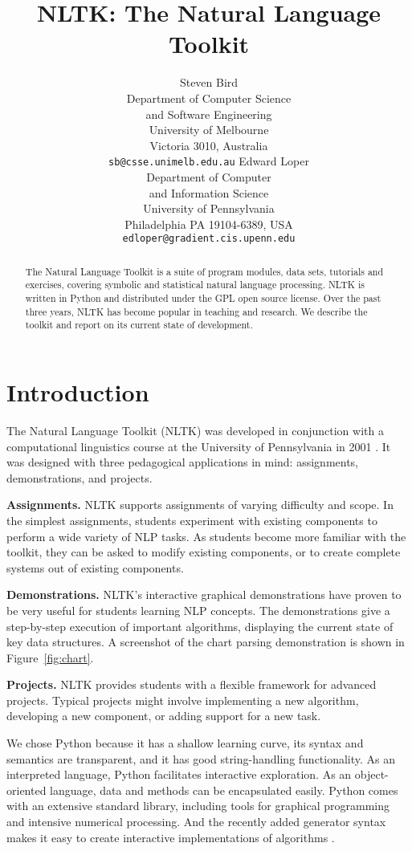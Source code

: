 \documentclass[11pt]{article}
\title{NLTK: The Natural Language Toolkit}
\author{
  Steven Bird \\
  Department of Computer Science \\
  \indent and Software Engineering \\
  University of Melbourne \\
  Victoria 3010, Australia \\  
  {\tt sb@csse.unimelb.edu.au}
\And
  Edward Loper\\
  Department of Computer \\
  \indent and Information Science \\
  University of Pennsylvania\\
  Philadelphia PA 19104-6389, USA\\
  {\tt edloper@gradient.cis.upenn.edu}
}
\date{}
\begin{document}
\maketitle

\begin{abstract}\small
  The Natural Language Toolkit is a suite of program modules, data
  sets, tutorials and exercises, covering symbolic and statistical
  natural language processing.  NLTK is written in Python and
  distributed under the GPL open source license.  Over the past three
  years, NLTK has become popular in teaching and research.  We
  describe the toolkit and report on its current state of development.
\end{abstract}

\section{Introduction}

The Natural Language Toolkit (NLTK) was developed in conjunction with
a computational linguistics course at the University of Pennsylvania
in 2001 \cite{LoperBird02}.  It was designed with three pedagogical
applications in mind: assignments, demonstrations, and projects.

\textbf{Assignments.}
NLTK supports assignments of varying difficulty
and scope.  In the simplest assignments, students experiment with
existing components to perform a wide variety of NLP tasks.  As students
become more familiar with the toolkit, they can be asked to modify
existing components, or to create complete systems out of existing
components.

\textbf{Demonstrations.}
NLTK's interactive graphical demonstrations have proven to be very
useful for students learning NLP concepts.
The demonstrations give a step-by-step execution of important
algorithms, displaying the current state of key data structures.
A screenshot of the chart parsing demonstration is shown in Figure~\ref{fig:chart}.

\textbf{Projects.}  NLTK provides students with a flexible framework
for advanced projects.  Typical projects might involve implementing a
new algorithm, developing a new component, or adding support for a new
task.

We chose Python because it has a shallow learning curve, its syntax
and semantics are transparent, and it has good string-handling
functionality.  As an interpreted language, Python facilitates
interactive exploration.  As an object-oriented language, data and
methods can be encapsulated easily.  Python comes with an extensive
standard library, including tools for graphical programming and
intensive numerical processing.  And the recently added generator
syntax makes it easy to create interactive implementations of
algorithms \cite{Loper04,Rossum03intro,Rossum03ref}.
\end{document}

